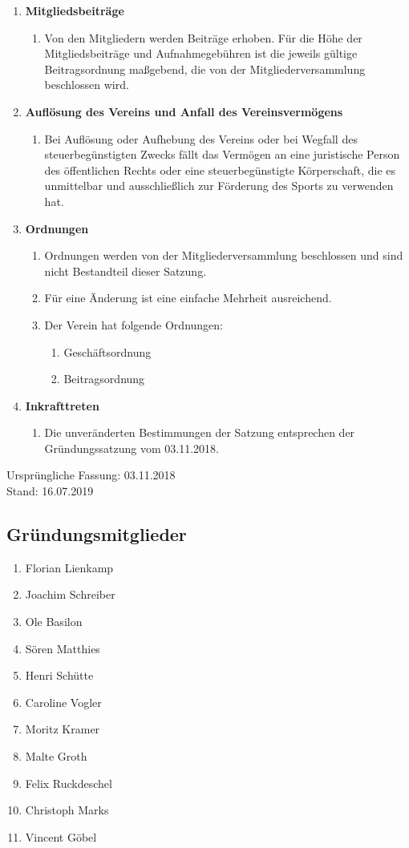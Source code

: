 \documentclass{article}
\begin{document}
\begin{enumerate}[§ 1.]
\item \textsf{\textbf{Mitgliedsbeiträge}}
\begin{enumerate}
\item[] Von den Mitgliedern werden Beiträge erhoben. Für die Höhe der Mitgliedsbeiträge und Aufnahmegebühren ist die jeweils gültige Beitragsordnung maßgebend, die von der Mitgliederversammlung beschlossen wird.
\end{enumerate}

\item \textsf{\textbf{Auflösung des Vereins und Anfall des Vereinsvermögens}}
\begin{enumerate}
\item[] Bei Auflösung oder Aufhebung des Vereins oder bei Wegfall des steuerbegünstigten Zwecks fällt das Vermögen an eine juristische Person des öffentlichen Rechts oder eine steuerbegünstigte Körperschaft, die es unmittelbar und ausschließlich zur Förderung des Sports zu verwenden hat.
\end{enumerate}

\item \textsf{\textbf{Ordnungen}}
\begin{enumerate}
\item Ordnungen werden von der Mitgliederversammlung beschlossen und sind nicht Bestandteil dieser Satzung.
\item Für eine Änderung ist eine einfache Mehrheit ausreichend.
\item Der Verein hat folgende Ordnungen:
\begin{enumerate}
\item Geschäftsordnung
\item Beitragsordnung
\end{enumerate}
\end{enumerate}

\item \textsf{\textbf{Inkrafttreten}}
\begin{enumerate}
\item[] Die unveränderten Bestimmungen der Satzung entsprechen der Gründungssatzung vom 03.11.2018.
\end{enumerate}

\end{enumerate}
Ursprüngliche Fassung: 03.11.2018\\
Stand: 16.07.2019


\subsection*{Gründungsmitglieder}
\begin{enumerate}
\item Florian Lienkamp
\item Joachim Schreiber
\item Ole Basilon
\item Sören Matthies
\item Henri Schütte
\item Caroline Vogler
\item Moritz Kramer
\item Malte Groth
\item Felix Ruckdeschel
\item Christoph Marks
\item Vincent Göbel
\end{enumerate}
\end{document}
